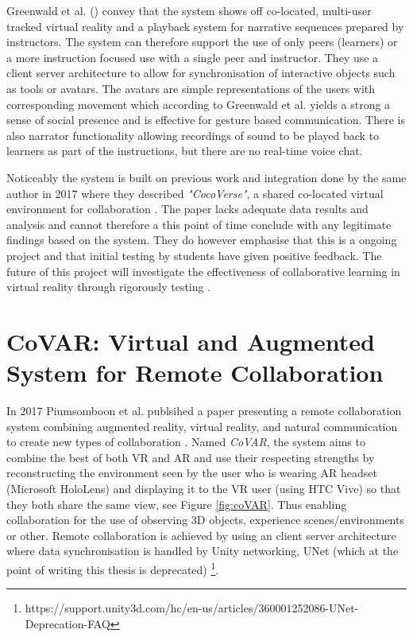 Greenwald et al. (\citeyear{greenwald2019electrovr}) convey that the system shows off co-located, multi-user tracked virtual reality and a playback system for narrative sequences prepared by instructors. The system can therefore support the use of only peers (learners) or a more instruction focused use with a single peer and instructor. They use a client server architecture to allow for synchronisation of interactive objects such as tools or avatars. The avatars are simple representations of the users with corresponding movement which according to  Greenwald et al. \cite{greenwald2017investigating} yields a strong a sense of social presence and is effective for gesture based communication. There is also narrator functionality allowing recordings of sound to be played back to learners as part of the instructions, but there are no real-time voice chat.

Noticeably the system is built on previous work and integration done by the same author in 2017 where they described \textit{"CocoVerse"}, a shared co-located virtual environment for collaboration \cite{greenwald2017multi}. The paper lacks adequate data results and analysis and cannot therefore a this point of time conclude with any legitimate findings based on the system. They do however emphasise that this is a ongoing project and that initial testing by students have given positive feedback. The future of this project will investigate the effectiveness of collaborative learning in virtual reality through rigorously testing \cite{greenwald2019electrovr}.  





\section{CoVAR: Virtual and Augmented System for Remote Collaboration}
In 2017 Piumsomboon et al. publsihed a paper presenting a remote collaboration system combining augmented reality, virtual reality, and natural communication to create new types of collaboration \cite{piumsomboon2017covar}. Named \textit{CoVAR}, the system aims to combine the best of both VR and AR and use their respecting strengths by reconstructing the environment seen by the user who is wearing AR headset (Microsoft HoloLens) and displaying it to the VR user (using HTC Vive) so that they both share the same view, see Figure \ref{fig:coVAR}. Thus enabling collaboration for the use of observing 3D objects, experience scenes/environments or other. Remote collaboration is achieved by using an client server architecture where data synchronisation is handled by Unity networking, UNet (which at the point of writing this thesis is deprecated) \footnote{https://support.unity3d.com/hc/en-us/articles/360001252086-UNet-Deprecation-FAQ}.


